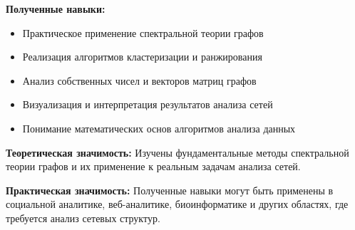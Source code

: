 \textbf{Полученные навыки:}
\begin{itemize}
    \item Практическое применение спектральной теории графов
    \item Реализация алгоритмов кластеризации и ранжирования
    \item Анализ собственных чисел и векторов матриц графов
    \item Визуализация и интерпретация результатов анализа сетей
    \item Понимание математических основ алгоритмов анализа данных
\end{itemize}

\textbf{Теоретическая значимость:} Изучены фундаментальные методы спектральной теории графов и их применение к реальным задачам анализа сетей.

\textbf{Практическая значимость:} Полученные навыки могут быть применены в социальной аналитике, веб-аналитике, биоинформатике и других областях, где требуется анализ сетевых структур.
